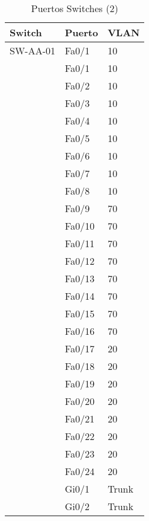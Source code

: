 \documentclass[a4paper,onecolumn,11pt]{article}
\begin{document}
\begin{table}[htbp]
\small \sffamily
\caption{Puertos Switches (2)}
\begin{center}
\begin{tabular}{p{}p{}p{}}
\toprule
\textbf{Switch} & \textbf{Puerto} & \textbf{VLAN}  \\
\toprule
SW-AA-01 & Fa0/1 & 10 \\ %
& Fa0/1 & 10\\
& Fa0/2 & 10\\
& Fa0/3 & 10\\
& Fa0/4 & 10\\
& Fa0/5 & 10\\
& Fa0/6 & 10\\
& Fa0/7 & 10\\
& Fa0/8 & 10\\
& Fa0/9 & 70\\
& Fa0/10 & 70\\
& Fa0/11 & 70\\
& Fa0/12 & 70\\
& Fa0/13 & 70\\
& Fa0/14 & 70\\
& Fa0/15 & 70\\
& Fa0/16 & 70\\
& Fa0/17 & 20\\
& Fa0/18 & 20\\
& Fa0/19 & 20\\
& Fa0/20 & 20\\
& Fa0/21 & 20\\
& Fa0/22 & 20\\
& Fa0/23 & 20\\
& Fa0/24 & 20\\
& Gi0/1 & Trunk  \\
& Gi0/2 & Trunk  \\ 
\bottomrule
\end{tabular}
\end{center}
\label{tab:puertos2}
\end{table}
\end{document}
